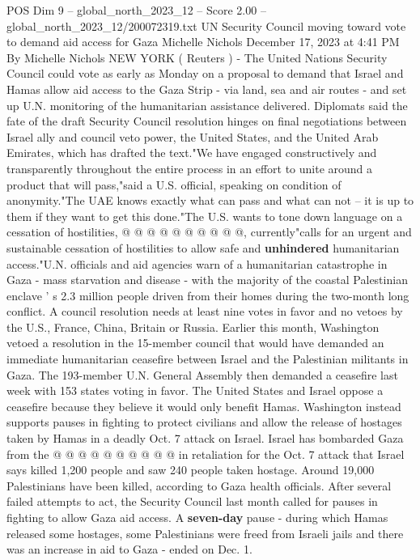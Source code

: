 \begin{textsample}{POS Dim 9 – global\_north\_2023\_12 – Score 2.00 – global\_north\_2023\_12/200072319.txt}  \label{ex:f9_pos_166}
UN Security Council moving toward vote to demand aid access for Gaza Michelle Nichols December 17, 2023 at 4:41 PM By Michelle Nichols NEW YORK ( Reuters ) - The United Nations Security Council could vote as early as Monday on a proposal to demand that Israel and Hamas allow aid access to the Gaza Strip - via land, sea and air routes - and set up U.N. monitoring of the humanitarian assistance delivered.
Diplomats said the fate of the draft Security Council resolution hinges on final negotiations between Israel ally and council veto power, the United States, and the United Arab Emirates, which has drafted the text."We have engaged constructively and transparently throughout the entire process in an effort to unite around a product that will pass,"said a U.S. official, speaking on condition of anonymity."The UAE knows exactly what can pass and what can not -- it is up to them if they want to get this done."The U.S. wants to tone down language on a cessation of hostilities, @ @ @ @ @ @ @ @ @ @, currently"calls for an urgent and sustainable cessation of hostilities to allow safe and \textbf{unhindered} humanitarian access."U.N. officials and aid agencies warn of a humanitarian catastrophe in Gaza - mass starvation and disease - with the majority of the coastal Palestinian enclave ' s 2.3 million people driven from their homes during the two-month long conflict.
A council resolution needs at least nine votes in favor and no vetoes by the U.S., France, China, Britain or Russia.
Earlier this month, Washington vetoed a resolution in the 15-member council that would have demanded an immediate humanitarian ceasefire between Israel and the Palestinian militants in Gaza.
The 193-member U.N.
General Assembly then demanded a ceasefire last week with 153 states voting in favor.
The United States and Israel oppose a ceasefire because they believe it would only benefit Hamas.
Washington instead supports pauses in fighting to protect civilians and allow the release of hostages taken by Hamas in a deadly Oct. 7 attack on Israel.
Israel has bombarded Gaza from the @ @ @ @ @ @ @ @ @ @ in retaliation for the Oct. 7 attack that Israel says killed 1,200 people and saw 240 people taken hostage.
Around 19,000 Palestinians have been killed, according to Gaza health officials.
After several failed attempts to act, the Security Council last month called for pauses in fighting to allow Gaza aid access.
A \textbf{seven-day} pause - during which Hamas released some hostages, some Palestinians were freed from Israeli jails and there was an increase in aid to Gaza - ended on Dec. 1.

\end{textsample}
